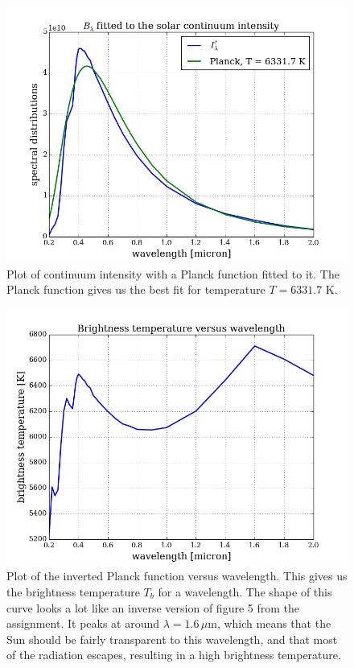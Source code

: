 \documentclass{article}
\begin{document}
\begin{figure}[H]
  \centering
  \includegraphics[scale=0.5]{../figures/task2/solspect_h_planck.png}
  \caption{Plot of continuum intensity with a Planck function fitted to it. The Planck function gives us the best fit for temperature $T = 6331.7$ K.} 
\end{figure}

\begin{figure}[H]
  \centering
  \includegraphics[scale=0.5]{../figures/task2/solspect_h_Tb.png}
  \caption{Plot of the inverted Planck function versus wavelength. This gives us the brightness temperature $T_b$ for a wavelength. The shape of this curve looks a lot like an inverse version of figure 5 from the assignment. It peaks at around $\lambda = 1.6\,\mu$m, which means that the Sun should be fairly transparent to this wavelength, and that most of the radiation escapes, resulting in a high brightness temperature.}
\end{figure}
\end{document}
